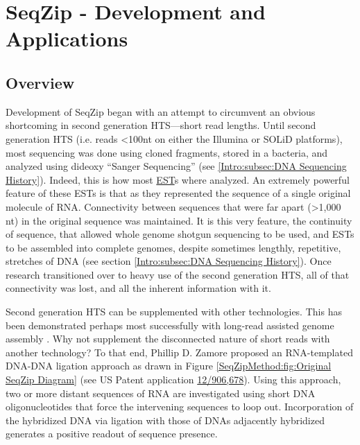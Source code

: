 \chapter{SeqZip - Development and Applications} 
\label{SeqZipMethod} 
\section{Overview}
  \label{SeqZipMethod:sec:SeqZip Overview}

  Development of SeqZip began with an attempt to circumvent an obvious shortcoming in second generation HTS---short read lengths. Until second generation HTS (i.e. reads <100nt on either the Illumina or SOLiD platforms), most sequencing was done using cloned fragments, stored in a bacteria, and analyzed using dideoxy ``Sanger Sequencing'' (see \ref{Intro:subsec:DNA Sequencing History}). Indeed, this is how most \hyperref[hd:abrevs]{EST}s where analyzed. An extremely powerful feature of these ESTs is that as they represented the sequence of a single original molecule of RNA. Connectivity between sequences that were far apart (>1,000 nt) in the original sequence was maintained. It is this very feature, the continuity of sequence, that allowed whole genome shotgun sequencing to be used, and ESTs to be assembled into complete genomes, despite sometimes lengthly, repetitive, stretches of DNA (see section \ref{Intro:subsec:DNA Sequencing History}). Once research transitioned over to heavy use of the second generation HTS, all of that connectivity was lost, and all the inherent information with it.

  Second generation HTS can be supplemented with other technologies. This has been demonstrated perhaps most successfully with long-read assisted genome assembly \citep{Koren2012a}. Why not supplement the disconnected nature of short reads with another technology? To that end, Phillip D. Zamore proposed an RNA-templated DNA-DNA ligation approach as drawn in Figure \ref{SeqZipMethod:fig:Original SeqZip Diagram} (see US Patent application \href{http://1.usa.gov/PTG9BB}{12/906,678}). Using this approach, two or more distant sequences of RNA are investigated using short DNA oligonucleotides that force the intervening sequences to loop out. Incorporation of the hybridized DNA via ligation with those of DNAs adjacently hybridized generates a positive readout of sequence presence.

